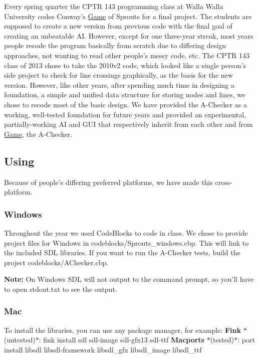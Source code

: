 Every spring quarter the C\+P\+T\+R 143 programming class at Walla Walla University codes Conway's \hyperlink{classGame}{Game} of Sprouts for a final project. The students are supposed to create a new version from previous code with the final goal of creating an unbeatable A\+I. However, except for one three-\/year streak, most years people recode the program basically from scratch due to differing design approaches, not wanting to read other people's messy code, etc. The C\+P\+T\+R 143 class of 2013 chose to take the 2010v2 code, which looked like a single person's side project to check for line crossings graphically, as the basis for the new version. However, like other years, after spending much time in designing a foundation, a simple and unified data structure for storing nodes and lines, we chose to recode most of the basic design. We have provided the A-\/\+Checker as a working, well-\/tested foundation for future years and provided an experimental, partially-\/working A\+I and G\+U\+I that respectively inherit from each other and from \hyperlink{classGame}{Game}, the A-\/\+Checker.

\subsection*{Using }

Because of people's differing preferred platforms, we have made this cross-\/platform.

\subsubsection*{Windows}

Throughout the year we used Code\+Blocks to code in class. We chose to provide project files for Windows in {\ttfamily codeblocks/\+Sprouts\+\_\+windows.\+cbp}. This will link to the included S\+D\+L libraries. If you want to run the A-\/\+Checker tests, build the project {\ttfamily codeblocks/\+A\+Checker.\+cbp}.

{\bfseries Note\+:} On Windows S\+D\+L will not output to the command prompt, so you'll have to open {\ttfamily stdout.\+txt} to see the output.

\subsubsection*{Mac}

To install the libraries, you can use any package manager, for example\+: {\bfseries Fink} $\ast$(untested)$\ast$\+: {\ttfamily fink install sdl sdl-\/image sdl-\/gfx13 sdl-\/ttf} {\bfseries Macports} $\ast$(tested)$\ast$\+: {\ttfamily port install libsdl libsdl-\/framework libsdl\+\_\+gfx libsdl\+\_\+image libsdl\+\_\+ttf}

